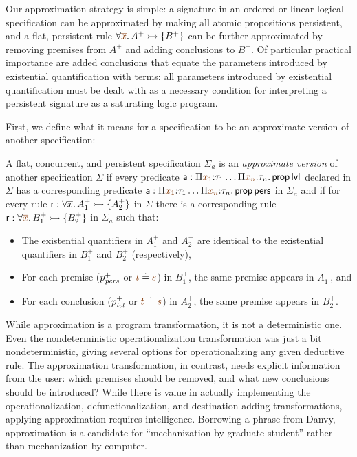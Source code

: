 Our approximation strategy is simple: a signature in an ordered or
linear logical specification can be approximated by making all atomic
propositions persistent, and a flat, persistent rule $\forall
\lf{\overline{x}}. \,A^+ \lefti \{ B^+ \}$ can be further approximated by
removing premises from $A^+$ and adding conclusions to $B^+$. Of
particular practical importance are added conclusions that equate the
parameters introduced by existential quantification with terms: all
parameters introduced by existential quantification must be dealt with
as a necessary condition for interpreting a persistent signature as a
saturating logic program.

First, we define what it means for a specification to be an approximate
version of another specification:

\bigskip
\begin{definition}\label{def:approxversion}
  A flat, concurrent, and persistent specification $\Sigma_a$ is an
  {\em approximate version} of another specification $\Sigma$ if every
  predicate ${\sf a} : \Pi \lf{x_1}{:}\tau_1 \ldots \Pi \lf{x_n}{:}\tau_n.\,
  {\sf prop}\,{\sf lvl}$ declared in $\Sigma$ has a corresponding
  predicate ${\sf a} : \Pi \lf{x_1}{:}\tau_1 \ldots \Pi \lf{x_n}{:}\tau_n.\,
  {\sf prop}\,{\sf pers}$ in $\Sigma_a$ and if for every rule ${\sf
    r} : \forall \overline{x}.\,A_1^+ \rightarrowtail \{ A_2^+ \}$ in $\Sigma$ there
  is a corresponding rule ${\sf r} : \forall \lf{\overline{x}}.\,B_1^+ \lefti
  \{ B_2^+ \}$ in $\Sigma_a$ such that:
  \begin{itemize}
  \item The existential quantifiers in $A_1^+$ and $A_2^+$ are
    identical to the existential quantifiers in $B_1^+$ and $B_2^+$
    (respectively),
  \item For each premise ($p^+_{\it pers}$ or $\lf{t} \doteq \lf{s}$) in $B^+_1$,
    the same premise appears in $A^+_1$, and 
  \item For each conclusion ($p^+_{\it lvl}$ or $\lf{t}
    \doteq \lf{s}$) in $A^+_2$, the same premise appears in $B^+_2$.
  \end{itemize}
\end{definition}
\bigskip

\noindent
While approximation is a program transformation, it is not a
deterministic one. Even the nondeterministic operationalization
transformation was just a bit nondeterministic, giving several options
for operationalizing any given deductive rule. The approximation
transformation, in contrast, needs explicit information from the user:
which premises should be removed, and what new conclusions should be
introduced? While there is value in actually implementing the
operationalization, defunctionalization, and destination-adding
transformations, applying approximation requires
intelligence. Borrowing a phrase from Danvy, approximation is a
candidate for ``mechanization by graduate student'' rather than
mechanization by computer.

